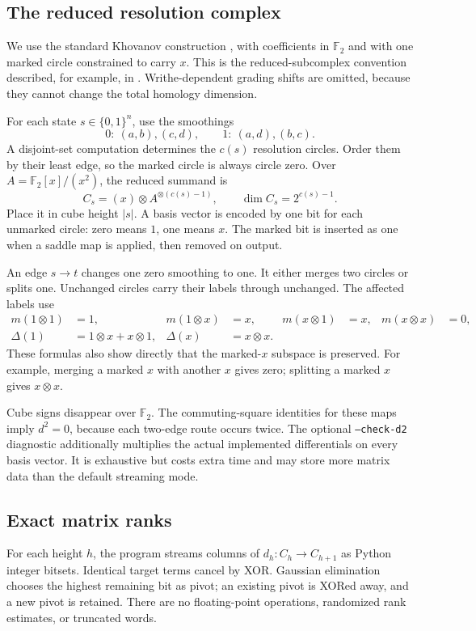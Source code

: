 \documentclass[11pt]{article}
\theoremstyle{definition}\newtheorem{definition}[theorem]{Definition}
\newcommand{\F}{\mathbb F_2}
\begin{document}
\subsection{The reduced resolution complex}

We use the standard Khovanov construction \cite{khovanov,barnatan}, with
coefficients in $\F$ and with one marked circle constrained to carry $x$.
This is the reduced-subcomplex convention described, for example, in
\cite[Section 2.2]{lobbzentner}. Writhe-dependent grading shifts are omitted,
because they cannot change the total homology dimension.

For each state $s\in\{0,1\}^n$, use the smoothings
\[
 0:\ (a,b),(c,d),\qquad 1:\ (a,d),(b,c).
\]
A disjoint-set computation determines the $c(s)$ resolution circles. Order them
by their least edge, so the marked circle is always circle zero. Over
$A=\F[x]/(x^2)$, the reduced summand is
\[
 C_s=(x)\otimes A^{\otimes(c(s)-1)},\qquad
 \dim C_s=2^{c(s)-1}.
\]
Place it in cube height $|s|$. A basis vector is encoded by one bit for each
unmarked circle: zero means $1$, one means $x$. The marked bit is inserted as
one when a saddle map is applied, then removed on output.

An edge $s\to t$ changes one zero smoothing to one. It either merges two
circles or splits one. Unchanged circles carry their labels through unchanged.
The affected labels use
\begin{align*}
 m(1\otimes1)&=1,&m(1\otimes x)&=x,&m(x\otimes1)&=x,&m(x\otimes x)&=0,\\
 \Delta(1)&=1\otimes x+x\otimes1,&\Delta(x)&=x\otimes x.
\end{align*}
These formulas also show directly that the marked-$x$ subspace is preserved.
For example, merging a marked $x$ with another $x$ gives zero; splitting a
marked $x$ gives $x\otimes x$.

Cube signs disappear over $\F$. The commuting-square identities for these
maps imply $d^2=0$, because each two-edge route occurs twice. The optional
\texttt{--check-d2} diagnostic additionally multiplies the actual implemented
differentials on every basis vector. It is exhaustive but costs extra time
and may store more matrix data than the default streaming mode.

\subsection{Exact matrix ranks}

For each height $h$, the program streams columns of
$d_h:C_h\to C_{h+1}$ as Python integer bitsets. Identical target terms cancel
by XOR. Gaussian elimination chooses the highest remaining bit as pivot; an
existing pivot is XORed away, and a new pivot is retained. There are no
floating-point operations, randomized rank estimates, or truncated words.
\end{document}
